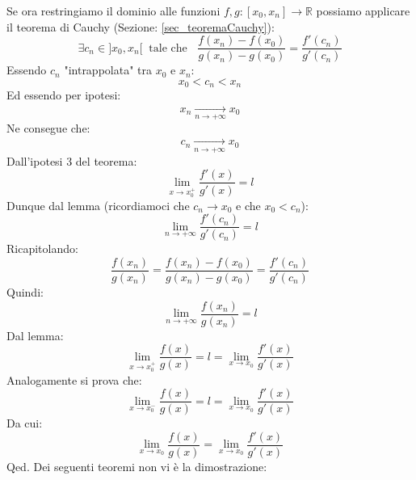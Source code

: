 {\begin{equation*}
	\end{equation*}
	Se ora restringiamo il dominio alle funzioni $f,g:[x_0, x_n] \to 
    \mathbb{R}$ possiamo applicare il teorema di Cauchy (Sezione: 
    \ref{sec_teoremaCauchy}):
	\begin{equation*}
		\exists c_n \in ]x_0, x_n[ \;\; \text{tale che } \;\; \dfrac{f(x_n) - 
        f(x_0)}{g(x_n) - g(x_0)} = \dfrac{f'(c_n)}{g'(c_n)}
	\end{equation*}
	Essendo $c_n$ "intrappolata" tra $x_0$ e $x_n$:
	\begin{equation*}
		x_0 < c_n < x_n
	\end{equation*}
	Ed essendo per ipotesi:
	\begin{equation*}
		x_n \xrightarrow[n \to + \infty]{} x_0
	\end{equation*}
	Ne consegue che:
	\begin{equation*}
		c_n \xrightarrow[n \to + \infty]{} x_0
	\end{equation*}
	Dall'ipotesi 3 del teorema:
	\begin{equation*}
		\lim_{x \to x_0^+} \dfrac{f'(x)}{g'(x)} = l
	\end{equation*}
	Dunque dal lemma (ricordiamoci che $c_n \to x_0$ e che $x_0 < c_n$):
	\begin{equation*}
		\lim_{n \to +\infty} \dfrac{f'(c_n)}{g'(c_n)} = l
	\end{equation*}
	Ricapitolando:
	\begin{equation*}
		\dfrac{f(x_n)}{g(x_n)} = \dfrac{f(x_n) - f(x_0)}{g(x_n) - g(x_0)} = 
        \dfrac{f'(c_n)}{g'(c_n)}
	\end{equation*}
	Quindi:
	\begin{equation*}
		\lim_{n \to + \infty} \dfrac{f(x_n)}{g(x_n)} = l
	\end{equation*}
	Dal lemma:
	\begin{equation*}
		\lim_{x \to x_0^+} \dfrac{f(x)}{g(x)} = l = \lim_{x \to x_0} 
        \dfrac{f'(x)}{g'(x)}
	\end{equation*}
	Analogamente si prova che:
	\begin{equation*}
		\lim_{x \to x_0^-} \dfrac{f(x)}{g(x)} = l = \lim_{x \to x_0} 
        \dfrac{f'(x)}{g'(x)}
	\end{equation*}
	Da cui:
	\begin{equation*}
		\lim_{x \to x_0} \dfrac{f(x)}{g(x)} = \lim_{x \to x_0} 
        \dfrac{f'(x)}{g'(x)}
	\end{equation*}
	\hfill Qed.
}
Dei seguenti teoremi non vi è la dimostrazione:

